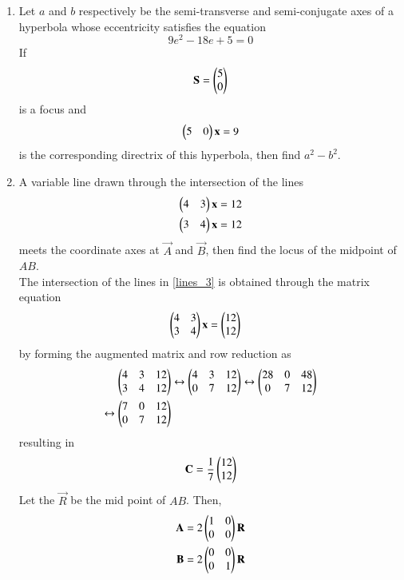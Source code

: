 \documentclass[journal,12pt,twocolumn]{IEEEtran}
\begin{document}
\begin{enumerate}[label=\arabic*]
\item Let $a$ and $b$ respectively be the semi-transverse and semi-conjugate axes of a hyperbola whose 
eccentricity satisfies the equation
\begin{equation}
9e^2-18e+5 = 0
\end{equation}
If 
\begin{equation} 
\mathbf{S}=\begin{pmatrix}5\\ 0\end{pmatrix}
\end{equation}
is a focus and 
\begin{equation} 
\begin{pmatrix}5 & 0\end{pmatrix}\mathbf{x} = 9
\end{equation} 
%
is the corresponding directrix of this hyperbola, then find $a^2-b^2$.
\item A variable line drawn through the 
intersection of the lines 
\begin{align} 
\label{lines_3}
\begin{pmatrix}4 & 3\end{pmatrix}\mathbf{x} &=12 
\\ 
\begin{pmatrix}3 & 4\end{pmatrix}\mathbf{x} &=12 
\end{align} 
meets the coordinate axes at $\vec{A}$ and $\vec{B}$, then find the locus of the midpoint of $AB$. 
\\
\solution The intersection of the lines in \eqref{lines_3} is obtained through the matrix equation 
\begin{align}
\begin{pmatrix}4 & 3 \\ 3 & 4\end{pmatrix}\mathbf{x}  &=\begin{pmatrix}12\\12\end{pmatrix}
\end{align}
by forming the augmented matrix and row reduction as  
\begin{align}
\begin{pmatrix}4 & 3 &12 \\ 3 & 4 &12\end{pmatrix} &\leftrightarrow \begin{pmatrix}4 & 3 &12 \\ 0 & 7 &12\end{pmatrix} \leftrightarrow \begin{pmatrix}28 & 0 & 48 \\ 0 & 7 &12\end{pmatrix}
\nonumber \\
\leftrightarrow \begin{pmatrix}7 & 0 & 12 \\ 0 & 7 &12\end{pmatrix}&
\end{align}
resulting in 
\begin{align}
\mathbf{C}=\frac{1}{7}\begin{pmatrix}12\\12\end{pmatrix}
\end{align}
%
Let the $\vec{R}$ be the mid point of $AB$. Then,
\begin{align}
\label{eq:lines_3_abr}
\mathbf{A} =2 \begin{pmatrix}1 & 0\\0 & 0\end{pmatrix}\mathbf{R} 
\\
\mathbf{B} =2 \begin{pmatrix}0 & 0\\0 & 1\end{pmatrix}\mathbf{R} 
\end{align}

\end{enumerate}
\end{document}
